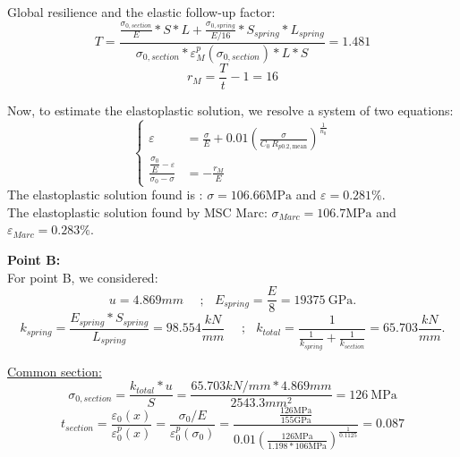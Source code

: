 \documentclass[10pt,a4paper]{article}
\begin{document}
Global resilience and the elastic follow-up factor:
\begin{equation*}
T=\frac{\frac{\sigma_{0,section}}{E}*S*L+\frac{\sigma_{0,spring}}{E/16}*S_{spring}*L_{spring}}{\sigma_{0,section}*\varepsilon_M^p(\sigma_{0,section})*L*S}=1.481
\end{equation*}
\begin{equation*}
r_M=\frac{T}{t}-1=16 
\end{equation*}


Now, to estimate the elastoplastic solution, we resolve a system of two equations:
\begin{equation*} 
\left\{ \begin{aligned} 
\varepsilon &= \frac{\sigma}{E} + 0.01 \left( \frac{\sigma}{C_0\,R_{p0.2,\mathrm{mean}}} \right)^{\frac{1}{n_0}} \\[1em]
\frac{\dfrac{\sigma_0}{E}-\varepsilon} {\sigma_0-\sigma} &= -\frac{r_M}{E} 
\end{aligned} \right.
\end{equation*}
The elastoplastic solution found is :  $\sigma=106.66\mathrm{MPa}$ and $\varepsilon=0.281 \%$. \\
The elastoplastic solution found by MSC Marc: $\sigma_{Marc}=106.7\mathrm{MPa}$ and $\varepsilon_{Marc}=0.283 \%$.



\newpage
\textbf{Point B:} \\
For point B, we considered:
\begin{equation*}
u=4.869mm \ \ \ \ \ \ \text{;} \ \ \ \ E_{spring}=\frac{E}{8}=19375 ~\mathrm{GPa}.
\end{equation*}
\begin{equation*}
k_{spring}=\frac{E_{spring}*S_{spring}}{L_{spring}}=98.554 \frac{kN}{mm} \ \ \ \ \ \ \text{;} \ \ \ \ k_{total}=\frac{1}{\frac{1}{k_{spring}}+\frac{1}{k_{section}}}=65.703 \frac{kN}{mm}.
\end{equation*}

\underline{Common section:} \\
\begin{equation*}
\sigma_{0,section} = \frac{k_{total}*u}{S} = \frac{65.703 kN/mm * 4.869mm}{2543.3 mm^2}=126~\mathrm{MPa}
\end{equation*}
\begin{equation*}
t_{section} = \frac{\varepsilon_0(x)}{\varepsilon_0^p(x)}=\frac{\sigma_0/E}{\varepsilon_0^p(\sigma_0)}=\frac{\frac{126\mathrm{MPa}}{155\mathrm{GPa}}}{0.01\left( \frac{126\mathrm{MPa}}{1.198*106\mathrm{MPa}} \right)^{\frac{1}{0.1125}}}=0.087
\end{equation*}
\end{document}

